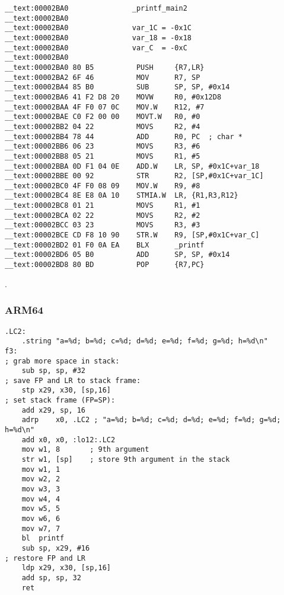 \begin{lstlisting}
__text:00002BA0               _printf_main2
__text:00002BA0
__text:00002BA0               var_1C = -0x1C
__text:00002BA0               var_18 = -0x18
__text:00002BA0               var_C  = -0xC
__text:00002BA0
__text:00002BA0 80 B5          PUSH     {R7,LR}
__text:00002BA2 6F 46          MOV      R7, SP
__text:00002BA4 85 B0          SUB      SP, SP, #0x14
__text:00002BA6 41 F2 D8 20    MOVW     R0, #0x12D8
__text:00002BAA 4F F0 07 0C    MOV.W    R12, #7
__text:00002BAE C0 F2 00 00    MOVT.W   R0, #0
__text:00002BB2 04 22          MOVS     R2, #4
__text:00002BB4 78 44          ADD      R0, PC  ; char *
__text:00002BB6 06 23          MOVS     R3, #6
__text:00002BB8 05 21          MOVS     R1, #5
__text:00002BBA 0D F1 04 0E    ADD.W    LR, SP, #0x1C+var_18
__text:00002BBE 00 92          STR      R2, [SP,#0x1C+var_1C]
__text:00002BC0 4F F0 08 09    MOV.W    R9, #8
__text:00002BC4 8E E8 0A 10    STMIA.W  LR, {R1,R3,R12}
__text:00002BC8 01 21          MOVS     R1, #1
__text:00002BCA 02 22          MOVS     R2, #2
__text:00002BCC 03 23          MOVS     R3, #3
__text:00002BCE CD F8 10 90    STR.W    R9, [SP,#0x1C+var_C]
__text:00002BD2 01 F0 0A EA    BLX      _printf
__text:00002BD6 05 B0          ADD      SP, SP, #0x14
__text:00002BD8 80 BD          POP      {R7,PC}
\end{lstlisting}

.

\subsubsection{ARM64}


\begin{lstlisting}
.LC2:
	.string	"a=%d; b=%d; c=%d; d=%d; e=%d; f=%d; g=%d; h=%d\n"
f3:
; grab more space in stack:
	sub	sp, sp, #32
; save FP and LR to stack frame:
	stp	x29, x30, [sp,16]
; set stack frame (FP=SP):
	add	x29, sp, 16
	adrp	x0, .LC2 ; "a=%d; b=%d; c=%d; d=%d; e=%d; f=%d; g=%d; h=%d\n"
	add	x0, x0, :lo12:.LC2
	mov	w1, 8		; 9th argument
	str	w1, [sp]	; store 9th argument in the stack
	mov	w1, 1
	mov	w2, 2
	mov	w3, 3
	mov	w4, 4
	mov	w5, 5
	mov	w6, 6
	mov	w7, 7
	bl	printf
	sub	sp, x29, #16
; restore FP and LR
	ldp	x29, x30, [sp,16]
	add	sp, sp, 32
	ret
\end{lstlisting}

